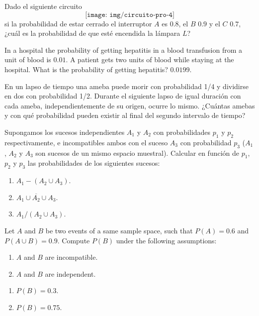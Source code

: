 {Dado el siguiente circuito
\[
\texttt{[image: img/circuito-pro-4]}
 \]
si la probabilidad de estar cerrado el interruptor $A$ es $0.8$, el $B$ $0.9$ y el $C$ $0.7$, ¿cuál es la probabilidad
de que esté encendida la lámpara $L$?
}
{}
{}


{In a hospital the probability of getting hepatitis in a blood transfusion from a unit of blood is $0.01$.
A patient gets two units of blood while staying at the hospital.
What is the probability of getting hepatitis?
}
{$0.0199$.}
{}


{En un lapso de tiempo una ameba puede morir con probabilidad 1/4 y dividirse en dos con probabilidad 1/2.
Durante el siguiente lapso de igual duración con cada ameba, independientemente de su origen, ocurre lo mismo.
¿Cuántas amebas y con qué probabilidad pueden existir al final del segundo intervalo de tiempo?
}
{}
{}


{Supongamos los sucesos independientes $A_{1}$ y $A_{2}$ con probabilidades $p_{1}$ y $p_{2}$ respectivamente, e
incompatibles ambos con el suceso $A_{3}$ con probabilidad $p_{3}$ ($A_{1}$, $A_{2}$ y $A_{3}$ son sucesos de un mismo
espacio muestral).
Calcular en función de $p_{1}$, $p_{2}$ y $p_{3}$ las probabilidades de los siguientes sucesos:
\begin{enumerate}
\item  $A_{1}-(A_{2}\cup A_{3})$.
\item  $\overline{A_{1}\cup A_{2}\cup A_{3}}$.
\item  $A_{1}/(A_{2}\cup A_{3})$.
\end{enumerate}
}
{}
{}


{Let $A$ and $B$ be two events of a same sample space, such that $P(A)=0.6$ and $P(A\cup B)=0.9.$
Compute $P(B)$ under the following assumptions:
\begin{enumerate}
\item $A$ and $B$ are incompatible.
\item $A$ and $B$ are independent.
\end{enumerate}
}
{
\begin{enumerate}
\item $P(B)=0.3$.
\item $P(B)=0.75$.
\end{enumerate}
}
{}



